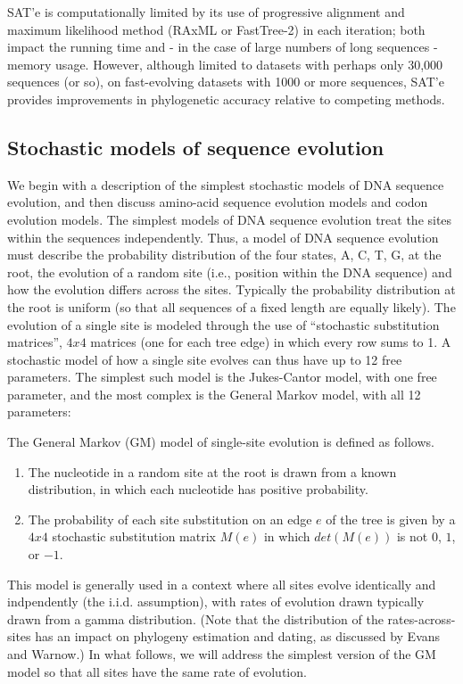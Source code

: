 SAT'e is computationally limited by its use of progressive alignment and maximum
likelihood method (RAxML or FastTree-2) in each iteration; both impact the 
running time and - in the case of large numbers of long sequences - memory usage. However,
although limited to datasets with perhaps only 30,000 sequences (or so), on fast-evolving
datasets with 1000 or more sequences, SAT'e provides improvements in phylogenetic 
accuracy relative to competing methods.

\subsection{Stochastic models of sequence evolution}
We begin with a description of the simplest stochastic models of DNA sequence 
evolution, and then discuss amino-acid sequence evolution models and codon evolution models.
The simplest models of DNA sequence evolution treat the sites within the sequences 
independently. Thus, a model of DNA sequence evolution must describe the probability
distribution of the four states, A, C, T, G, at the root, the evolution of a random site (i.e.,
position within the DNA sequence) and how the evolution differs across the sites. 
Typically the probability distribution at the root is uniform (so that all sequences of a fixed
length are equally likely). The evolution of a single site is modeled through the use of
``stochastic substitution matrices'', $4 x 4$ matrices (one for each tree edge) in which every
row sums to 1. A stochastic model of how a single site evolves can thus have up to 12 free
parameters. The simplest such model is the Jukes-Cantor model, with one free parameter,
and the most complex is the General Markov model, with all 12 parameters:

\begin{defn}
The General Markov (GM) model of single-site evolution is defined as follows.

\begin{enumerate}
	\item The nucleotide in a random site at the root is drawn from a known distribution, in
which each nucleotide has positive probability.
	\item The probability of each site substitution on an edge $e$ of the tree is given by a $4 x 4$
stochastic substitution matrix $M(e)$ in which $det(M(e))$ is not $0$, $1$, or $-1$.	
\end{enumerate}
\end{defn}

This model is generally used in a context where all sites evolve identically and 
indpendently (the i.i.d. assumption), with rates of evolution drawn typically drawn from a
gamma distribution. (Note that the distribution of the rates-across-sites has an impact
on phylogeny estimation and dating, as discussed by Evans and Warnow.) In what
follows, we will address the simplest version of the GM model so that all sites have the
same rate of evolution.

